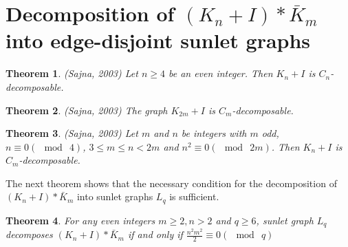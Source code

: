 \documentclass[12pt]{report}
\newtheorem{thm}{Theorem}[section]
\begin{document}
\section{Decomposition of  $(K_n+I)*\bar{K}_m$ into edge-disjoint sunlet graphs }
\begin{thm}\label{T:SNA1}(Sajna, 2003) %
 Let $n\geq 4$ be an even integer. Then $K_n+I$ is
$C_n$-decomposable.
\end{thm}
\begin{thm}\label{T:SNA2}(Sajna, 2003) %
 The graph $K_{2m}+I$ is $C_m$-decomposable.
\end{thm}
\begin{thm}\label{T:SNA3}(Sajna, 2003) %
 Let $m$ and $n$ be integers with $m$ odd, $n\equiv 0(\mod\ 4)$,
$3\leq m\leq n<2m$ and $n^2\equiv 0(\mod\ 2m)$. Then $K_n+I$ is
$C_m$-decomposable.
\end{thm}
The next theorem shows that the necessary condition for the decomposition of $(K_n+I)*\bar{K}_m$ into sunlet graphs $L_q$ is sufficient.
\begin{thm}
For any even integers $m\geq 2, n>2$ and $q\geq 6$, sunlet graph
$L_q$ decomposes $(K_n+I)*\bar{K}_m$ if and only if
$\frac{n^2m^2}{2}\equiv 0(\mod\ q)$
\end{thm}
\end{document}
